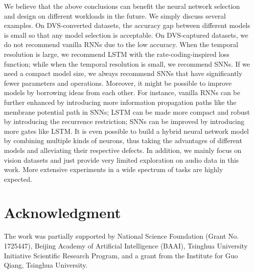 \documentclass[journal,10pt,twocolumn]{IEEETran}
\begin{document}
We believe that the above conclusions can benefit the neural network selection and design on different workloads in the future. We simply discuss several examples. On DVS-converted datasets, the accuracy gap between different models is small so that any model selection is acceptable. On DVS-captured datasets, we do not recommend vanilla RNNs due to the low accuracy. When the temporal resolution is large, we recommend LSTM with the rate-coding-inspired loss function; while when the temporal resolution is small, we recommend SNNs. If we need a compact model size, we always recommend SNNs that have significantly fewer parameters and operations. Moreover, it might be possible to improve models by borrowing ideas from each other. For instance, vanilla RNNs can be further enhanced by introducing more information propagation paths like the membrane potential path in SNNs; LSTM can be made more compact and robust by introducing the recurrence restriction; SNNs can be improved by introducing more gates like LSTM. It is even possible to build a hybrid neural network model by combining multiple kinds of neurons, thus taking the advantages of different models and alleviating their respective defects. In addition, we mainly focus on vision datasets and just provide very limited exploration on audio data in this work. More extensive experiments in a wide spectrum of tasks are highly expected. 
\section*{Acknowledgment}
The work was partially supported by National Science Foundation (Grant No. 1725447), Beijing Academy of Artificial Intelligence (BAAI), Tsinghua University Initiative Scientific Research Program, and a grant from the Institute for Guo Qiang, Tsinghua University.



\end{document}
